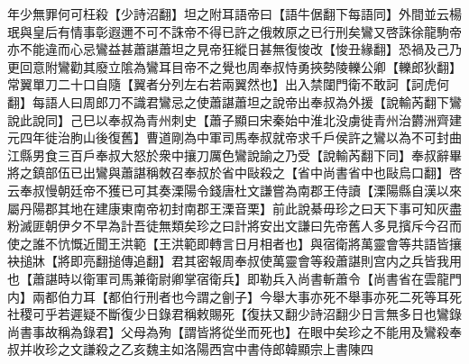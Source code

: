 年少無罪何可枉殺【少詩沼翻】坦之附耳語帝曰【語牛倨翻下每語同】外間並云楊珉與皇后有情事彰遐邇不可不誅帝不得已許之俄敇原之已行刑矣鸞又啓誅徐龍駒帝亦不能違而心忌鸞益甚蕭諶蕭坦之見帝狂縱日甚無復悛改【悛丑緣翻】恐禍及己乃更回意附鸞勸其廢立隂為鸞耳目帝不之覺也周奉叔恃勇挾勢陵轢公卿【轢郎狄翻】常翼單刀二十口自隨【翼者分列左右若兩翼然也】出入禁闥門衛不敢訶【訶虎何翻】每語人曰周郎刀不識君鸞忌之使蕭諶蕭坦之說帝出奉叔為外援【說輸芮翻下鸞說此說同】己巳以奉叔為青州刺史【蕭子顯曰宋秦始中淮北没虜徙青州治欝洲齊建元四年徙治胊山後復舊】曹道剛為中軍司馬奉叔就帝求千戶侯許之鸞以為不可封曲江縣男食三百戶奉叔大怒於衆中攘刀厲色鸞說諭之乃受【說輸芮翻下同】奉叔辭畢將之鎮部伍已出鸞與蕭諶稱敇召奉叔於省中敺殺之【省中尚書省中也敺烏口翻】啓云奉叔慢朝廷帝不獲已可其奏溧陽令錢唐杜文謙嘗為南郡王侍讀【溧陽縣自漢以來屬丹陽郡其地在建康東南帝初封南郡王溧音栗】前此說綦毋珍之曰天下事可知灰盡粉滅匪朝伊夕不早為計吾徒無類矣珍之曰計將安出文謙曰先帝舊人多見擯斥今召而使之誰不忼慨近聞王洪範【王洪範即轉言日月相者也】與宿衛將萬靈會等共語皆攘袂搥牀【將即亮翻搥傳追翻】君其密報周奉叔使萬靈會等殺蕭諶則宫内之兵皆我用也【蕭諶時以衛軍司馬兼衛尉卿掌宿衛兵】即勒兵入尚書斬蕭令【尚書省在雲龍門内】兩都伯力耳【都伯行刑者也今謂之劊子】今舉大事亦死不舉事亦死二死等耳死社稷可乎若遲疑不斷復少日錄君稱敕賜死【復扶又翻少詩沼翻少日言無多日也鸞錄尚書事故稱為錄君】父母為殉【謂皆將從坐而死也】在眼中矣珍之不能用及鸞殺奉叔并收珍之文謙殺之乙亥魏主如洛陽西宫中書侍郎韓顯宗上書陳四

